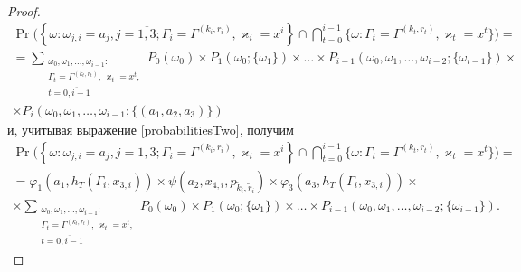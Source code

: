 \documentclass[a4paper,12pt,russian]{extarticle}
\begin{document}
\begin{proof}
\begin{multline*}
\Pr\biggl( \left\{ \omega \colon \omega_{j,i} = a_j,j=\overline{1,3}; \Gamma_i=\Gamma^{(k_i,r_i)}, \varkappa_i=x^i\right\} \cap \bigcap_{t=0}^{i-1}\{\omega\colon \Gamma_t=\Gamma^{(k_t,r_t)}, \varkappa_t=x^t\}\biggr) 
= \\ =\sum_{\substack{\omega_0, \omega_1,\ldots, \omega_{i-1} \colon \\ \Gamma_t=\Gamma^{(k_t,r_t)},\, \varkappa_t=x^t, \\ t=\overline{0,i-1}}} P_0(\omega_0)\times P_1(\omega_0;\{\omega_1\})\times\ldots \times P_{i-1}(\omega_0,\omega_1,\ldots, \omega_{i-2};\{\omega_{i-1}\})
\times \\[-2ex] \times P_i(\omega_0,\omega_1,\ldots, \omega_{i-1};\{(a_1, a_2, a_3)\})
\end{multline*}
и, учитывая выражение \eqref{probabilitiesTwo}, получим
\begin{multline}
\Pr\biggl( \left\{ \omega \colon \omega_{j,i} = a_j, j=\overline{1,3}; \Gamma_i=\Gamma^{(k_i,r_i)}, \varkappa_i=x^i\right\} \cap \bigcap_{t=0}^{i-1}\{\omega\colon \Gamma_t=\Gamma^{(k_t,r_t)}, \varkappa_t=x^t\}\biggr) 
=\\=\varphi_1(a_1,h_T(\Gamma_i,x_{3,i})) \times \psi(a_2,x_{4,i}, p_{\tilde{k}_i,\tilde{r}_i}) \times  \varphi_3(a_3,h_T(\Gamma_i,x_{3,i}))
\times \\ \times \sum_{\substack{\omega_0, \omega_1,\ldots, \omega_{i-1} \colon \\ \Gamma_t=\Gamma^{(k_t,r_t)},\, \varkappa_t=x^t,\\ t=\overline{0,i-1}}} P_0(\omega_0)\times P_1(\omega_0;\{\omega_1\})\times \ldots \times P_{i-1}(\omega_0,\omega_1,\ldots, \omega_{i-2};\{\omega_{i-1}\}).
\label{Construction:4}
\end{multline}


\end{proof}
\end{document}
